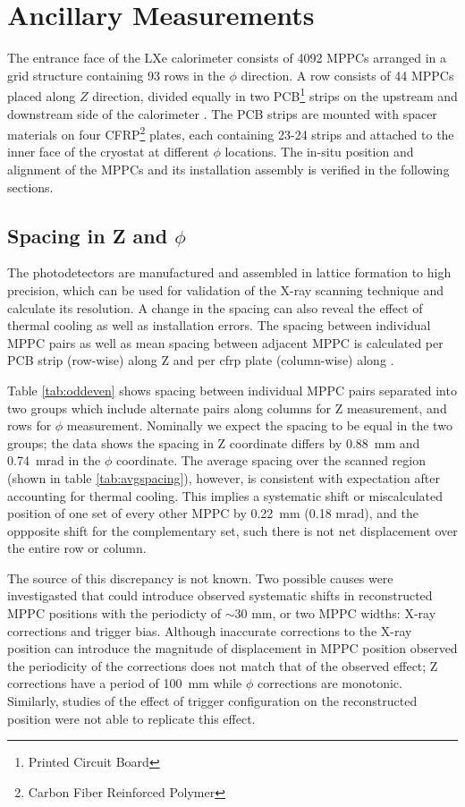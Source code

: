 \section{Ancillary Measurements}
The entrance face of the LXe calorimeter consists of 4092 MPPCs
arranged in a grid structure containing 93 rows in the $\phi$ direction.  
A row consists of 44 MPPCs placed along $Z$ direction, divided equally in two
PCB\footnote{Printed Circuit Board} strips on the upstream and
downstream side of the calorimeter \cite{megdesign}.  The PCB strips
are mounted with spacer materials on four CFRP\footnote{Carbon Fiber
Reinforced Polymer} plates, each containing 23-24 strips and attached
to the inner face of the cryostat at different $\phi$ locations.  The
in-situ position and alignment of the MPPCs and its installation
assembly is verified in the following sections.

\subsection{ Spacing in Z and $\phi$}
The photodetectors are manufactured and assembled in lattice formation
to high precision, which can be used for validation of the X-ray
scanning technique and calculate its resolution.  A change in the
spacing can also reveal the effect of thermal cooling as well as
installation errors.  The spacing between individual MPPC pairs as
well as mean spacing between adjacent MPPC is calculated per PCB strip
(row-wise) along Z and per cfrp plate (column-wise) along \phis. 

Table \ref{tab:oddeven} shows spacing between individual MPPC pairs separated
into two groups which include alternate pairs along columns for Z measurement,
and rows for $\phi$ measurement.  Nominally we expect the spacing to be equal in
the two groups; the data shows the spacing in Z coordinate differs by 0.88~mm
and 0.74~mrad in the $\phi$ coordinate.  The average spacing over the scanned
region (shown in table \ref{tab:avgspacing}), however, is consistent with
expectation after accounting for thermal cooling.  
This implies a systematic shift or miscalculated position 
of one set of every other MPPC by 0.22~mm (0.18 mrad), and the oppposite 
shift for the complementary set, such there is not net displacement over the entire
row or column. 


The source of this discrepancy is not known.
Two possible causes were investigasted that could introduce observed 
systematic shifts in reconstructed MPPC positions with the periodicty of 
$\sim$30 mm, or two MPPC widths: X-ray corrections and trigger bias.
Although inaccurate corrections to the X-ray position can introduce the magnitude of 
displacement in MPPC position observed the periodicity of the corrections
does not match that of the observed effect; Z corrections have a period of 
100~mm while $\phi$ corrections are monotonic.
Similarly, studies of the effect of trigger configuration on the reconstructed position 
were not able to replicate this effect. 


